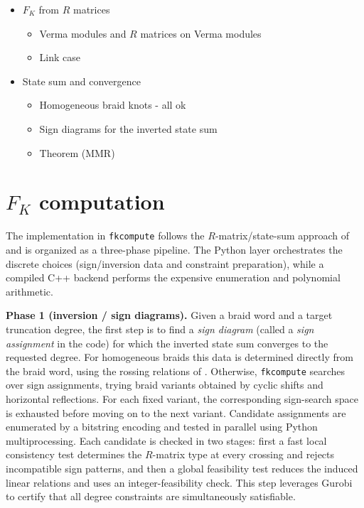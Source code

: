 \documentclass[twocolumn]{article}
\begin{document}
\begin{itemize}
    \item $F_K$ from $R$ matrices
    \begin{itemize}
        \item Verma modules and $R$ matrices on Verma modules
        \item Link case
    \end{itemize}
    \item State sum and convergence
    \begin{itemize}
        \item Homogeneous braid knots - all ok
        \item Sign diagrams for the inverted state sum
        \item Theorem (MMR)
    \end{itemize}
\end{itemize}

\section{$F_K$ computation}

The implementation in \texttt{fkcompute} follows the $R$-matrix/state-sum approach of \cite{Park20,Park21} and is organized as a three-phase pipeline. The Python layer orchestrates the discrete choices (sign/inversion data and constraint preparation), while a compiled C++ backend performs the expensive enumeration and polynomial arithmetic.

\noindent\textbf{Phase 1 (inversion / sign diagrams).} 
Given a braid word and a target truncation degree, the first step is to find a \emph{sign diagram} (called a \emph{sign assignment} in the code) for which the inverted state sum converges to the requested degree. 
For homogeneous braids this data is determined directly from the braid word, using the rossing relations of \cite{Park21}.
Otherwise, \texttt{fkcompute} searches over sign assignments, trying braid variants obtained by cyclic shifts and horizontal reflections.
For each fixed variant, the corresponding sign-search space is exhausted before moving on to the next variant. 
Candidate assignments are enumerated by a bitstring encoding and tested in parallel using Python multiprocessing. 
Each candidate is checked in two stages: first a fast local consistency test determines the $R$-matrix type at every crossing and rejects incompatible sign patterns, and then a global feasibility test reduces the induced linear relations and uses an integer-feasibility check.
This step leverages Gurobi to certify that all degree constraints are simultaneously satisfiable.
\end{document}
